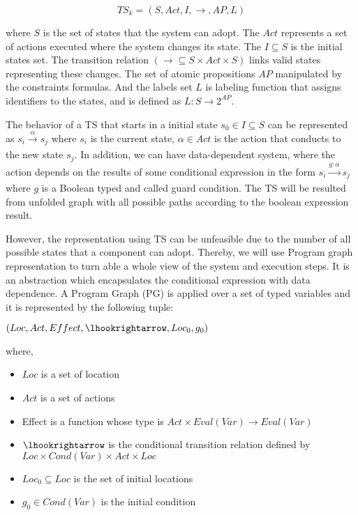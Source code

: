 \begin{center}
\begin{equation}
        TS_{k} = (S, Act, I, \longrightarrow, AP ,L)
        \label{TS01}
    \end{equation}
\end{center}

where $S$ is the set of states that the system can adopt. The $Act$ represents a set of actions executed where the system changes its state. The $I \subseteq S$ is the initial states set. The transition relation $(\longrightarrow \subseteq S \times Act \times S)$ links valid states representing these changes. The set of atomic propositions $AP$ manipulated by the constraints formulas. And the labels set $L$ is labeling function that assigns identifiers to the states, and is defined as $L:S \longrightarrow 2^{AP}$.

The behavior of a TS that starts in a initial state $s_0 \in I \subseteq S$ can be represented as $s_i \xrightarrow[]{\alpha} s_j$ where $s_i$ is the current state, $\alpha \in Act$ is the action that conducts to the new state $s_j$. In addition, we can have data-dependent system, where the action depends on the results of some conditional expression in the form $s_i \xrightarrow[]{g:\alpha} s_j$ where $g$ is a Boolean typed and called guard condition. The TS will be resulted from unfolded graph with all possible paths according to the boolean expression result\cite{baier}.

However, the representation using TS can be unfeasible due to the number of all possible states that a component can adopt. Thereby, we will use Program graph representation to turn able a whole view of the system and execution steps. It is an abstraction which encapsulates the conditional expression with data dependence. A Program Graph (PG) is applied over a set of typed variables and it is represented by the following tuple:

\begin{center}
    $(Loc,Act,Effect,\lhookrightarrow,Loc_0,g_0)$
\end{center}

where,

\begin{itemize}
	\item $Loc$ is a set of location  
	\item $Act$ is a set of actions
	\item Effect is a function whose type is $Act \times Eval(Var) \to Eval(Var)$
	\item $\lhookrightarrow$ is the conditional transition relation defined by $Loc \times Cond(Var) \times Act \times Loc$
	\item $Loc_0 \subseteq Loc$ is the set of initial locations
	\item $g_0 \in Cond(Var)$ is the initial condition
\end{itemize}

